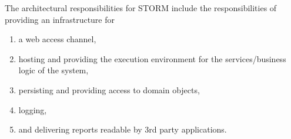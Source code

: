 The architectural responsibilities for STORM include the responsibilities of providing an infrastructure for
\begin{enumerate}
\item a web access channel,
\item hosting and providing the execution environment for the services/business logic of the system,
\item persisting and providing access to domain objects,
\item logging,
\item and delivering reports readable by 3rd party applications.
\end{enumerate}
